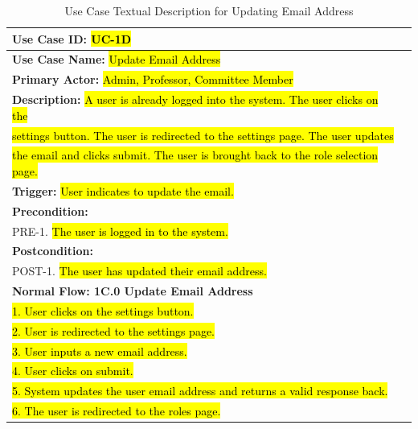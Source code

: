 \documentclass[fontsize=12pt,paper=letter,twoside]{scrartcl}
\begin{document}
\begin{table}[!htb]
\begin{center}
\begin{tabular}{|l|l|}
\hline
\textbf{Use Case ID:} \hl{UC-1D} \\ \hline
\textbf{Use Case Name:} \hl{Update Email Address} \\ \hline
\textbf {Primary Actor:} \hl{Admin, Professor, Committee Member}\\ \hline
\textbf{Description:} \hl{A user is already logged into the system. The user clicks on the }\\ \hl{settings button. The user is redirected to the settings page. The user updates }\\ \hl{the email and clicks submit. The user is brought back to the role selection page.}\\ \hline
\textbf{Trigger:} \hl{User indicates to update the email.}\\ \hline
\textbf{Precondition:}
\\ PRE-1. \hl{The user is logged in to the system.}\\ \hline
\textbf{Postcondition:}
\\ POST-1. \hl{The user has updated their email address.}\\ \hline
\textbf{Normal Flow: 1C.0 Update Email Address}
\\ \hl{1. User clicks on the settings button.}
\\ \hl{2. User is redirected to the settings page.}
\\ \hl{3. User inputs a new email address.}
\\ \hl{4. User clicks on submit.}
\\ \hl{5. System updates the user email address and returns a valid response back.}
\\ \hl{6. The user is redirected to the roles page.}\\ \hline
\end{tabular}
\end{center}
\caption {Use Case Textual Description for Updating Email Address}
\label{tbl:uc1Dtd}
\end{table}

\clearpage
\newpage
\end{document}
